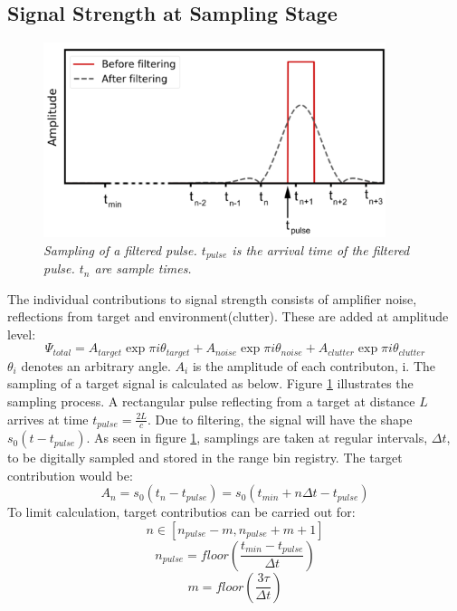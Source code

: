 \documentclass[letterpaper]{book}
\begin{document}
\subsection{Signal Strength at Sampling Stage}
\begin{figure}
  \includegraphics[width=10cm]{Samplings.png}
  \caption{\textit{Sampling of a filtered pulse. \(t_{pulse}\) is the arrival time of the filtered pulse. \(t_{n}\) are sample times.}}
  \label{fig:samplings}
\end{figure}
The individual contributions to signal strength consists of amplifier noise, reflections from target and environment(clutter). These are added at amplitude level:
\begin{equation} \label{eq:total_signal}
\Psi_{total} = A_{target}\exp{\pi i\theta_{target}} + A_{noise}\exp{\pi i\theta_{noise}} + A_{clutter}\exp{\pi i\theta_{clutter}}
\end{equation}
\(\theta_{i}\) denotes an arbitrary angle. \(A_{i}\) is the amplitude of each contributon, i. The sampling of a target signal is calculated as below. Figure \ref{fig:samplings} illustrates the sampling process. A rectangular pulse reflecting from a target at distance \(L\) arrives at time \(t_{pulse}=\frac{2L}{c}\). Due to filtering, the signal will have the shape \(s_{0}(t-t_{pulse})\). As seen in figure \ref{fig:samplings}, samplings are taken at regular intervals, \(\Delta t\), to be digitally sampled and stored in the range bin registry. The target contribution would be:
\begin{equation}
A_{n} = s_{0}(t_{n}-t_{pulse})=s_{0}(t_{min}+n\Delta t-t_{pulse})
\end{equation}
To limit calculation, target contributios can be carried out for:
\begin{equation}
n\in[n_{pulse}-m, n_{pulse}+m+1]
\end{equation}
\begin{equation}
n_{pulse}=floor(\frac{t_{min}-t_{pulse}}{\Delta t})
\end{equation}
\begin{equation}
m=floor{(\frac{3\tau}{\Delta t})}
\end{equation}
\end{document}
